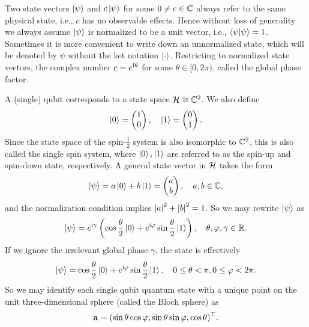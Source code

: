 Two state vectors $\ket{\psi}$ and $c\ket{\psi}$ for some $0\ne c\in \mathbb{C}$ always refer to the same physical state, i.e., $c$ has no observable effects. Hence without loss of generality we always assume $\ket{\psi}$ is normalized to be a unit vector, i.e., $\braket{\psi|\psi}=1$. Sometimes it is more convenient to write down an unnormalized state, which will be denoted by $\psi$ without the ket notation $\ket{\cdot}$. 
Restricting to normalized state vectors, the complex number $c=e^{\mathrm{i}\theta}$ for some $\theta\in [0,2\pi)$, called the global phase factor. 

\begin{exam}
A (single) qubit corresponds to a state space $\mathcal{H}\cong\mathbb{C}^2$. We also define
\begin{equation}
\ket{0}=\begin{pmatrix}
1\\ 0
\end{pmatrix}, \quad
\ket{1}=
\begin{pmatrix}
0 \\ 1
\end{pmatrix}.
\end{equation}
Since the state space of the spin-$\frac12$ system is also isomorphic to $\mathbb{C}^2$, this is also called the single spin system, where $\ket{0},\ket{1}$ are referred to as the spin-up and spin-down state, respectively. 
A general state vector in $\mathcal{H}$ takes the form 
\begin{equation}
\ket{\psi}=a\ket{0}+b\ket{1}=\begin{pmatrix}
a\\ b
\end{pmatrix}, \quad a,b\in\mathbb{C},
\end{equation}
and the normalization condition implies $\left\lvert a\right\rvert^2+\left\lvert b\right\rvert^2=1$.  
So we may rewrite $\ket{\psi}$ as
\begin{equation}
\ket{\psi}=e^{\mathrm{i} \gamma}\left(\cos \frac{\theta}{2} \ket{0}+e^{\mathrm{i} \varphi} \sin \frac{\theta}{2} \ket{1}\right), \quad \theta,\varphi,\gamma\in\mathbb{R}.
\end{equation}
If we ignore the irrelevant global phase $\gamma$, 
the state is effectively
\begin{equation}
\ket{\psi}=\cos \frac{\theta}{2} \ket{0}+e^{\mathrm{i} \varphi} \sin \frac{\theta}{2} \ket{1}, \quad 0\le\theta<\pi,0\le\varphi<2\pi.
\end{equation}
So we may identify each single qubit quantum state with a unique point on the unit three-dimensional sphere (called the Bloch sphere) as
\begin{equation}
\mathbf{a}=(\sin\theta \cos\varphi, \sin\theta\sin\varphi,\cos\theta)^{\top}.
\end{equation}
\end{exam}

